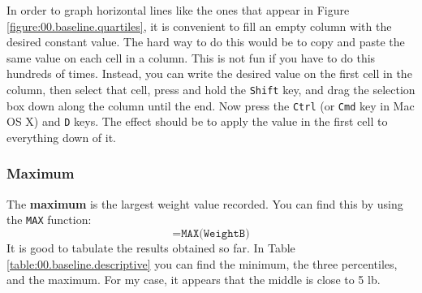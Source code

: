 In order to graph horizontal lines like the ones that appear in Figure \ref{figure:00.baseline.quartiles}, it is convenient to fill an empty column with the desired constant value. The hard way to do this would be to copy and paste the same value on each cell in a column. This is not fun if you have to do this hundreds of times. Instead, you can write the desired value on the first cell in the column, then select that cell, press and hold the \texttt{Shift} key, and drag the selection box down along the column until the end. Now press the \texttt{Ctrl} (or \texttt{Cmd} key in Mac OS X) and \texttt{D} keys. The effect should be to apply the value in the first cell to everything down of it. 
\subsubsection{Maximum}
The \textbf{maximum} is the largest weight value recorded. You can find this by using the \texttt{MAX} function:
\begin{equation}
    \texttt{=MAX(WeightB)}
\end{equation}
It is good to tabulate the results obtained so far. In Table \ref{table:00.baseline.descriptive} you can find the minimum, the three percentiles, and the maximum. For my case, it appears that the middle is close to 5 lb.
\begin{center}
\end{center}
